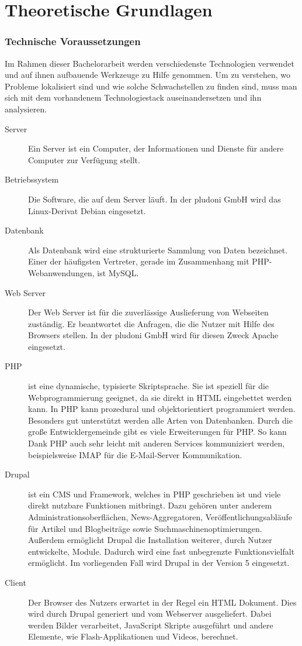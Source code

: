 \part{Theoretische Grundlagen}
\label{sec:theory}

\section{Technische Voraussetzungen}
Im Rahmen dieser Bachelorarbeit werden verschiedenste Technologien verwendet und auf ihnen aufbauende Werkzeuge zu Hilfe genommen. Um zu verstehen, wo Probleme lokalisiert sind und wie solche Schwachstellen zu finden sind, muss man sich mit dem vorhandenem Technologiestack auseinandersetzen und ihn analysieren.
\begin{description}
  \item[Server] Ein Server ist ein Computer, der Informationen und Dienste für andere Computer zur Verfügung stellt.
  \item[Betriebssystem] Die Software, die auf dem Server läuft. In der pludoni GmbH wird das Linux-Derivat Debian eingesetzt.
  \item[Datenbank] Als Datenbank wird eine strukturierte Sammlung von Daten bezeichnet. Einer der häufigsten Vertreter, gerade im Zusammenhang mit PHP-Webanwendungen, ist MySQL.
  \item[Web Server] Der Web Server ist für die zuverlässige Auslieferung von Webseiten zuständig. Er beantwortet die Anfragen, die die Nutzer mit Hilfe des Browsers stellen. In der pludoni GmbH wird f\"ur diesen Zweck Apache eingesetzt.
  \item[PHP] ist eine dynamische, typisierte Skriptsprache. Sie ist speziell f\"ur die Webprogrammierung geeignet, da sie direkt in HTML eingebettet werden kann.\citep{PHP2011} In PHP kann prozedural und objektorientiert programmiert werden. Besonders gut unterst\"utzt werden alle Arten von Datenbanken. Durch die gro\ss{}e Entwicklergemeinde gibt es viele Erweiterungen f\"ur PHP. So kann Dank PHP auch sehr leicht mit anderen Services kommuniziert werden, beispielsweise IMAP f\"ur die E-Mail-Server Kommunikation.\citep{PHP2011a}
  \item[Drupal] ist ein CMS und Framework, welches in PHP geschrieben ist und viele direkt nutzbare Funktionen mitbringt. Dazu gehören unter anderem Administrationsoberflächen, News-Aggregatoren, Veröffentlichungsabläufe für Artikel und Blogbeiträge sowie Suchmaschinenoptimierungen. Außerdem ermöglicht Drupal die Installation weiterer, durch Nutzer entwickelte, Module. Dadurch wird eine fast unbegrenzte Funktionsvielfalt ermöglicht. Im vorliegenden Fall wird Drupal in der Version 5 eingesetzt.
  \item[Client] Der Browser des Nutzers erwartet in der Regel ein HTML Dokument. Dies wird durch Drupal generiert und vom Webserver ausgeliefert. Dabei werden Bilder verarbeitet, JavaScript Skripte ausgeführt und andere Elemente, wie Flash-Applikationen und Videos, berechnet. 
\end{description}
